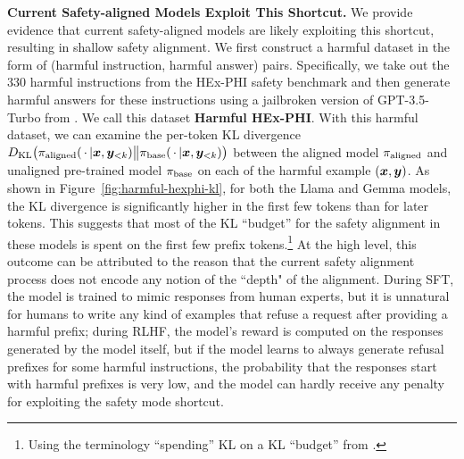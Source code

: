 \textbf{Current Safety-aligned Models Exploit This Shortcut.}
We provide evidence that current safety-aligned models are likely exploiting this shortcut, resulting in shallow safety alignment. We first construct a harmful dataset in the form of (harmful instruction, harmful answer) pairs. Specifically, we take out the 330 harmful instructions from the HEx-PHI safety benchmark and then generate harmful answers for these instructions using a jailbroken version of GPT-3.5-Turbo from \citet{qi2023fine}. We call this dataset \textbf{Harmful HEx-PHI}. With this harmful dataset, we can examine the per-token KL divergence $D_{\text{KL}}\big(\pi_{\mathrm{aligned}}(\,\cdot\, | \bm{x}, \bm{y}_{< {k}}) \big\| \pi_{\mathrm{base}}(\,\cdot\, | \bm{x}, \bm{y}_{< {k}}) \big)$ between the aligned model $\pi_{\mathrm{aligned}}$ and unaligned pre-trained model $\pi_{\mathrm{base}}$ on each of the harmful example $(\bm{x}, \bm{y})$. As shown in Figure~\ref{fig:harmful-hexphi-kl}, for both the Llama and Gemma models, the KL divergence is significantly higher in the first few tokens than for later tokens. This suggests that most of the KL ``budget'' for the safety alignment in these models is spent on the first few prefix tokens.\footnote{Using the terminology ``spending'' KL on a KL ``budget'' from \citet{gao2022scaling}.} At the high level, this outcome can be attributed to the reason that the current safety alignment process does not encode any notion of the ``depth" of the alignment. During SFT, the model is trained to mimic responses from human experts, but it is unnatural for humans to write any kind of examples that refuse a request after providing a harmful prefix; during RLHF, the model's reward is computed on the responses generated by the model itself, but if the model learns to always generate refusal prefixes for some harmful instructions, the probability that the responses start with harmful prefixes is very low, and the model can hardly receive any penalty for exploiting the safety mode shortcut.









